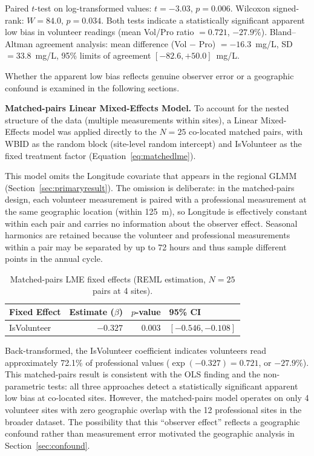 \documentclass[lineno]{wlpeerj}
\begin{document}
Paired $t$-test on log-transformed values: $t = -3.03$, $p = 0.006$. Wilcoxon signed-rank: $W = 84.0$, $p = 0.034$. Both tests indicate a statistically significant apparent low bias in volunteer readings (mean Vol/Pro ratio $= 0.721$, $-27.9\%$). Bland--Altman agreement analysis: mean difference (Vol $-$ Pro) $= -16.3$~mg/L, SD $= 33.8$~mg/L, 95\% limits of agreement $[-82.6, +50.0]$~mg/L.

Whether the apparent low bias reflects genuine observer error or a geographic confound is examined in the following sections.

\textbf{Matched-pairs Linear Mixed-Effects Model.} To account for the nested structure of the data (multiple measurements within sites), a Linear Mixed-Effects model was applied directly to the $N=25$ co-located matched pairs, with WBID as the random block (site-level random intercept) and IsVolunteer as the fixed treatment factor (Equation~\ref{eq:matchedlme}).

This model omits the Longitude covariate that appears in the regional GLMM (Section~\ref{sec:primaryresult}). The omission is deliberate: in the matched-pairs design, each volunteer measurement is paired with a professional measurement at the same geographic location (within 125~m), so Longitude is effectively constant within each pair and carries no information about the observer effect. Seasonal harmonics are retained because the volunteer and professional measurements within a pair may be separated by up to 72 hours and thus sample different points in the annual cycle.

\begin{table}[ht]
\centering
\caption{Matched-pairs LME fixed effects (REML estimation, $N=25$ pairs at 4 sites).}
\label{tab:matchedlme}
\begin{tabular}{l r r l}
\toprule
Fixed Effect & Estimate ($\beta$) & $p$-value & 95\% CI \\
\midrule
IsVolunteer & $-0.327$ & 0.003 & $[-0.546, -0.108]$ \\
\bottomrule
\end{tabular}
\end{table}

Back-transformed, the IsVolunteer coefficient indicates volunteers read approximately 72.1\% of professional values ($\exp(-0.327) = 0.721$, or $-27.9\%$). This matched-pairs result is consistent with the OLS finding and the non-parametric tests: all three approaches detect a statistically significant apparent low bias at co-located sites. However, the matched-pairs model operates on only 4 volunteer sites with zero geographic overlap with the 12 professional sites in the broader dataset. The possibility that this ``observer effect'' reflects a geographic confound rather than measurement error motivated the geographic analysis in Section~\ref{sec:confound}.
\end{document}
